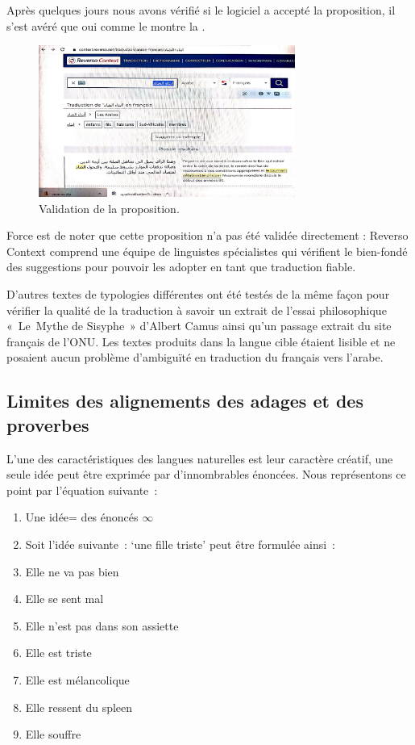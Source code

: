 \documentclass[french,english,brazil]{textolivre}
\begin{document}
Après quelques jours nous avons vérifié si le logiciel a accepté la proposition, il s’est avéré que oui comme le montre la . 

\begin{figure}[htbp]
 \centering
 \includegraphics[width=0.75\textwidth]{figure08.png}
 \caption{Validation de la proposition.}
 \label{fig-08}
\end{figure}

Force est de noter que cette proposition n’a pas été validée directement :  Reverso Context comprend une équipe de linguistes spécialistes qui vérifient le bien-fondé des suggestions pour pouvoir les adopter en tant que traduction fiable.

D’autres textes de typologies différentes ont été testés de la même façon pour vérifier la qualité de la traduction à savoir un extrait de l’essai philosophique « Le Mythe de Sisyphe » d’Albert Camus ainsi qu’un passage extrait du site français de l’ONU. Les textes produits dans la langue cible étaient lisible et ne posaient aucun problème d’ambiguïté en traduction du français vers l’arabe. 



\subsection{Limites des alignements des adages et des proverbes}\label{sec-limites}
L’une des caractéristiques des langues naturelles est leur caractère créatif, une seule idée peut être exprimée par d’innombrables énoncées. Nous représentons ce point par l’équation suivante : 

\begin{enumerate}
\item[] Une idée= des énoncés $\infty$
\item[] Soit l’idée suivante :  ‘une fille triste’ peut être formulée ainsi : 
\item Elle ne va pas bien
\item Elle se sent mal
\item Elle n’est pas dans son assiette
\item Elle est triste
\item Elle est mélancolique
\item Elle ressent du spleen
\item Elle souffre
\end{enumerate}
\end{document}
